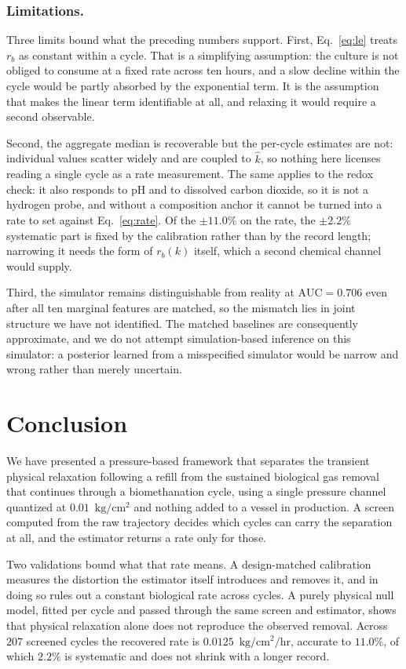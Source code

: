 \documentclass[sigconf]{acmart}
\newcommand{\pu}{\ensuremath{\mathrm{kg/cm^{2}}}}
\newcommand{\ratu}{\ensuremath{\mathrm{kg/cm^{2}/hr}}}
\newcommand{\rb}{\ensuremath{r_{b}}}
\newcommand{\kh}{\ensuremath{\hat{k}}}
\begin{document}
\subsubsection{Limitations.}
Three limits bound what the preceding numbers support. First,
Eq.~\eqref{eq:le} treats \rb{} as constant within a cycle. That is a
simplifying assumption: the culture is not obliged to consume at a
fixed rate across ten hours, and a slow decline within the cycle would
be partly absorbed by the exponential term. It is the assumption that
makes the linear term identifiable at all, and relaxing it would
require a second observable.

Second, the aggregate median is recoverable but the per-cycle estimates
are not: individual values scatter widely and are coupled to \kh{}, so
nothing here licenses reading a single cycle as a rate measurement. The
same applies to the redox check: it also responds to pH and to
dissolved carbon dioxide, so it is not a hydrogen probe, and without a
composition anchor it cannot be turned into a rate to set against
Eq.~\eqref{eq:rate}. Of the $\pm 11.0\%$ on the rate, the $\pm 2.2\%$
systematic part is fixed by the calibration rather than by the record
length; narrowing it needs the form of $\rb(k)$ itself, which a second
chemical channel would supply.

Third, the simulator remains distinguishable from reality at
$\mathrm{AUC}=0.706$ even after all ten marginal features are matched,
so the mismatch lies in joint structure we have not identified. The
matched baselines are consequently approximate, and we do not attempt
simulation-based inference on this simulator: a posterior learned from
a misspecified simulator would be narrow and wrong rather than merely
uncertain.

\section{Conclusion}

We have presented a pressure-based framework that separates the
transient physical relaxation following a refill from the sustained
biological gas removal that continues through a biomethanation cycle,
using a single pressure channel quantized at $0.01$~\pu{} and nothing
added to a vessel in production. A screen computed from the raw
trajectory decides which cycles can carry the separation at all, and
the estimator returns a rate only for those.

Two validations bound what that rate means. A design-matched
calibration measures the distortion the estimator itself introduces and
removes it, and in doing so rules out a constant biological rate across
cycles. A purely physical null model, fitted per cycle and passed
through the same screen and estimator, shows that physical relaxation
alone does not reproduce the observed removal. Across $207$ screened
cycles the recovered rate is $0.0125$~\ratu{}, accurate to $11.0\%$, of
which $2.2\%$ is systematic and does not shrink with a longer record.
\end{document}
